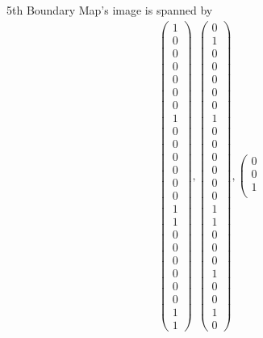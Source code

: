 \documentclass[8pt]{article}
\begin{document}
 5th Boundary Map's image is spanned by
 \begin{align*} \left(\begin{array}{r}
1 \\
0 \\
0 \\
0 \\
0 \\
0 \\
0 \\
1 \\
0 \\
0 \\
0 \\
0 \\
0 \\
0 \\
1 \\
1 \\
0 \\
0 \\
0 \\
0 \\
0 \\
0 \\
1 \\
1
\end{array}\right) ,
 \left(\begin{array}{r}
0 \\
1 \\
0 \\
0 \\
0 \\
0 \\
0 \\
1 \\
0 \\
0 \\
0 \\
0 \\
0 \\
0 \\
1 \\
1 \\
0 \\
0 \\
0 \\
1 \\
0 \\
0 \\
1 \\
0
\end{array}\right) ,
 \left(\begin{array}{r}
0 \\
0 \\
1 \\

\end{array}
\end{align*}
\end{document}
